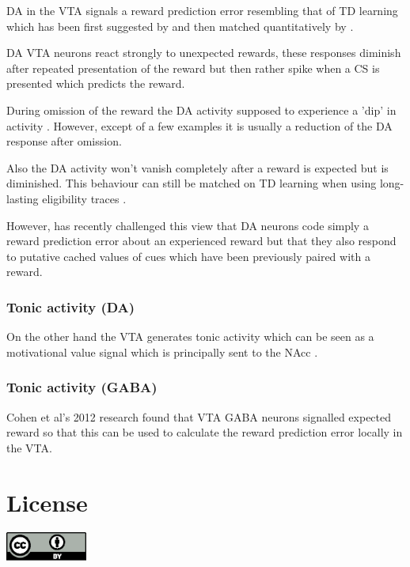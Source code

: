 \documentclass[12pt,a4paper]{article}
\let\oldsection\section
\renewcommand\section{\clearpage\oldsection}
\begin{document}
DA in the VTA signals a reward prediction error resembling that of TD learning which has been first suggested by \citep{Schultz1997} and then matched quantitatively by \citep{Bayer2005}.

DA VTA neurons react strongly to unexpected rewards, these responses diminish after repeated presentation of the reward but then rather spike when a CS is presented which predicts the reward. 

During omission of the reward the DA activity supposed to experience a 'dip' in activity \citep{Takahashi2017}. However, except of a few examples it is usually a reduction of the DA response after omission. 

Also the DA activity won't vanish completely after a reward is expected but is diminished. This behaviour can still be matched on TD learning when using long-lasting eligibility traces \citep{Pan2005}.

However, \citep{Sadacca2016} has recently challenged this view that DA neurons code simply a reward prediction error about an experienced reward but that they also respond to putative cached values of cues which have been previously paired with a reward.

\subsubsection{Tonic activity (DA)}

On the other hand the VTA generates tonic activity which can be seen as a motivational value signal which is principally sent to the NAcc \citep{Sesack2010}\citep{Bromberg-Martin2010} .

\subsubsection{Tonic activity (GABA)}

Cohen et al’s 2012 research found that VTA GABA neurons signalled expected reward \citep{Cohen2012} so that this can be used to calculate the reward prediction error locally in the VTA.


\appendix

\section{License}



\includegraphics[width=0.2\textwidth]{by.eps}





\end{document}
